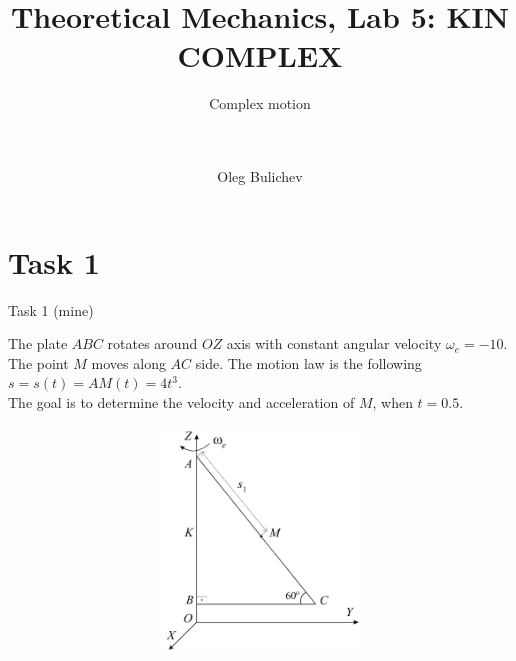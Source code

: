 \documentclass[aspectratio=169]{beamer}
\title[Theoretical Mechanics]{Theoretical Mechanics, Lab 5: KIN COMPLEX} %
\subtitle{Complex motion
\\ \ \\ \ 
         } %
\author{Oleg Bulichev}
\newcommand{\fbckg}[1]{\usebackgroundtemplate{\texttt{[image: \#1]}}}%
\begin{document}
\setlength{\abovedisplayskip}{0pt}
\setlength{\belowdisplayskip}{0pt}
\setlength{\abovedisplayshortskip}{0pt}
\setlength{\belowdisplayshortskip}{0pt}

\fbckg{fibeamer/figs/title_page.png}

\fbckg{fibeamer/figs/common.png}

\section*{Task 1}

\begin{frame}[t]{Task 1 (mine)}
\begin{minipage}{0.55\textwidth}
The plate $ABC$ rotates around $OZ$ axis with constant angular velocity $\omega_e=-10$. The point $M$ moves along $AC$ side. The motion law is the following $s=s(t)=AM(t)=4t^3$.\\

The goal is to determine the velocity and acceleration of $M$, when $t=0.5$.
\end{minipage}
\begin{minipage}{0.43\textwidth}
        \begin{figure}[H]
    \includegraphics[height=6cm,width=1\textwidth,keepaspectratio]{lab5_task1_fig.png}\\
    \end{figure}
\end{minipage}
\end{frame}
\end{document}
